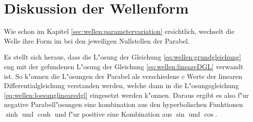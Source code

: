 \section{Diskussion der Wellenform}
\label{sec:wellen:diskussionwellenform}

Wie schon im Kapitel \ref{sec:wellen:parametervariation} ersichtlich, 
wechselt die Welle ihre Form im bei den jeweiligen Nullstellen der Parabel.

Es stellt sich heraus, dass die L"osung der Gleichung 
\ref{eq:wellen:grundgleichung} eng mit der gefundenen L"osung der Gleichung 
\ref{eq:wellen:lineareDGL} verwandt ist. So k"onnen die L"osungen der Parabel 
als verschiedene $c$ Werte der linearen Differentialgleichung verstanden 
werden, welche dann in die L"osungsgleichung \ref{eq:wellen:loesunglinearedgl} 
eingesetzt werden k"onnen. Daraus ergibt es also f"ur negative Parabell"osungen 
eine kombination aus den hyperbolischen Funktionen $\sinh$ und $\cosh$ und f"ur 
positive eine Kombination aus $\sin$ und $\cos$.
